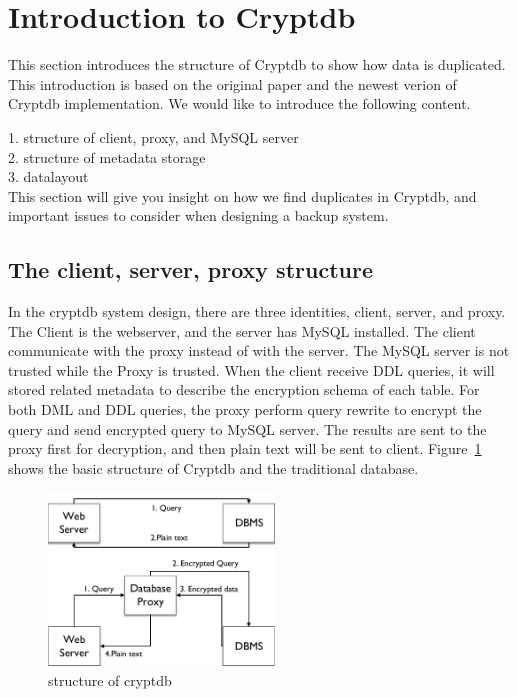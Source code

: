 \section{Introduction to Cryptdb}

This section introduces the structure of Cryptdb to show how data is duplicated. This introduction is based on the original paper and the newest verion of Cryptdb implementation. We would like to introduce the following content.

1. structure of client, proxy, and MySQL server\\

2. structure of metadata storage\\

3. datalayout \\

This section will give you insight on how we find duplicates in Cryptdb, and important issues to consider when designing a backup system.

\subsection{The client, server, proxy structure}


In the cryptdb system design, there are three identities, client, server, and proxy. The Client is the webserver, and the server has MySQL installed. The client communicate with the proxy instead of with the server. The MySQL server is not trusted while the Proxy is trusted. When the client receive DDL queries, it will stored related metadata to describe the encryption schema of each table. For both DML and DDL queries, the proxy perform query rewrite to encrypt the query and send encrypted query to MySQL server. The results are sent to the proxy first for decryption, and then plain text will be sent to client. Figure~\ref{fig:stack1} shows the basic structure of Cryptdb and the traditional database. 


\begin{figure}[tb]
\centering
\includegraphics[width=6cm]{images/Cryptdb-structure.pdf}
\caption{structure of cryptdb}
\label{fig:stack1}
\end{figure}



